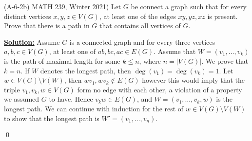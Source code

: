 \documentclass[11pt]{book}
\theoremstyle{definition}
\begin{document}
(A-6-2b) MATH 239, Winter 2021) Let $G$ be connect a graph such that for every distinct vertices $x,y,z\in V(G)$, at least one of the edges $xy, yz, xz$ is present. Prove that there is a path in $G$ that contains all vertices of $G$. 

\textbf{\underline{Solution:}}  Assume $G$ is a connected graph and for every three vertices $a,b,c \in V(G)$, at least one of $ab,bc,ac\in E(G)$. Assume that $W = (v_1,\dots,v_k)$ is the path of maximal length for some $k \leq n$, where $n = |V(G)|$. We prove that $k = n$. If $W$ denotes the longest path, then $\deg(v_1) = \deg(v_k) = 1$. Let $w\in V(G) \setminus V(W)$, then $wv_1, wv_k \not\in E(G)$ however this would imply that the triple $v_1,v_k,w \in V(G)$ form no edge with each other, a violation of a property we assumed $G$ to have. Hence $v_kw\in E(G)$, and $W = (v_1,\dots,v_k,w)$ is the longest path. We can continue with induction for the rest of $w \in V(G)\setminus V(W)$ to show that the longest path is $W' = (v_1,\dots,v_n)$.

\qed
\end{document}
